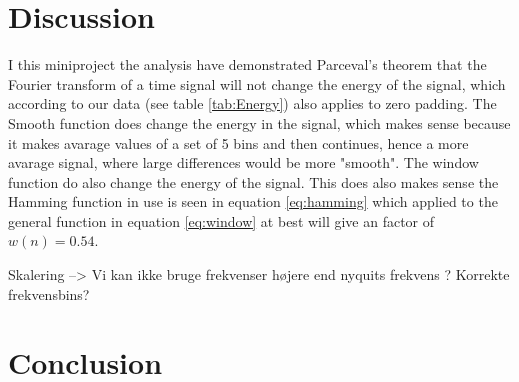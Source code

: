 

\section{Discussion}

I this miniproject the analysis have demonstrated Parceval's theorem that the Fourier transform of a time signal will not change the energy of the signal, which according to our data (see table \ref{tab:Energy}) also applies to zero padding. The Smooth function does change the energy in the signal, which makes sense because it makes avarage values of a set of 5 bins and then continues, hence a more avarage signal, where large differences would be more "smooth". The window function do also change the energy of the signal. This does also makes sense the Hamming function in use is seen in equation \eqref{eq:hamming} which applied to the general function in equation \eqref{eq:window} at best will give an factor of $w(n)=0.54$. 


Skalering --> Vi kan ikke bruge frekvenser højere end nyquits frekvens ?
Korrekte frekvensbins?

\section{Conclusion}